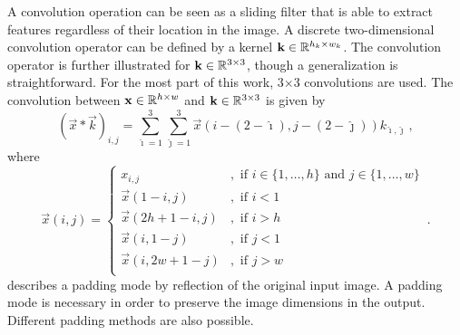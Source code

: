 A convolution operation can be seen as a sliding filter
that is able to extract features regardless of their location in the image.
A discrete two-dimensional convolution operator can be defined by a kernel $\mathbf k \in \mathbb{R}^{h_k\times w_k}$. 
The convolution operator is further illustrated for $\mathbf k \in \mathbb{R}^{3\times3}$, 
though a generalization is straightforward.
For the most part of this work, 3$\times$3 convolutions are used.
The convolution between $\mathbf x \in \mathbb{R}^{h\times w}$ and $\mathbf k \in \mathbb{R}^{3\times3}$ is given by
\begin{equation}
\label{eqn:convolution_kernel}
    (\vec x * \vec k)_{i,j}
    = \sum_{\hat \imath=1}^3 \sum_{\hat \jmath=1}^3 
        \vec x\left (i - (2 - \hat \imath), j - (2 - \hat \jmath) \right) k_{\hat \imath,\hat \jmath} \,,
\end{equation}
where
\begin{equation}
\label{eqn:convolution_padding}
    \vec x(i,j) =
    \begin{cases}
        x_{i,j} &, \text{ if } i \in \{1,\ldots, h\} \text{ and } j \in \{1,\ldots, w\} \\
        \vec x(1-i,j) &, \text{ if } i < 1 \\
        \vec x(2h + 1 - i,j) &, \text{ if } i > h \\
        \vec x(i,1-j) &, \text{ if } j < 1 \\
        \vec x(i, 2w + 1 - j) &, \text{ if } j > w \\
    \end{cases} \,.
\end{equation}
 describes a padding mode by reflection of the original input image.
A padding mode is necessary in order to preserve the image dimensions in the output.
Different padding methods are also possible.


